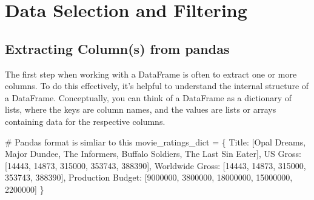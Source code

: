 \documentclass[
  letterpaper,
  DIV=11,
  numbers=noendperiod]{scrreprt}
\newenvironment{Shaded}{\begin{snugshade}}{\end{snugshade}}
\newcommand{\CommentTok}[1]{\textcolor[rgb]{0.37,0.37,0.37}{#1}}
\newcommand{\DecValTok}[1]{\textcolor[rgb]{0.68,0.00,0.00}{#1}}
\newcommand{\NormalTok}[1]{\textcolor[rgb]{0.00,0.23,0.31}{#1}}
\newcommand{\OperatorTok}[1]{\textcolor[rgb]{0.37,0.37,0.37}{#1}}
\newcommand{\StringTok}[1]{\textcolor[rgb]{0.13,0.47,0.30}{#1}}
\begin{document}
\hypertarget{data-selection-and-filtering}{%
\section{Data Selection and
Filtering}\label{data-selection-and-filtering}}

\hypertarget{extracting-columns-from-pandas}{%
\subsection{Extracting Column(s) from
pandas}\label{extracting-columns-from-pandas}}

The first step when working with a DataFrame is often to extract one or
more columns. To do this effectively, it's helpful to understand the
internal structure of a DataFrame. Conceptually, you can think of a
DataFrame as a dictionary of lists, where the keys are column names, and
the values are lists or arrays containing data for the respective
columns.

\begin{Shaded}
\begin{Highlighting}[]
\CommentTok{\# Pandas format is simliar to this}
\NormalTok{movie\_ratings\_dict }\OperatorTok{=}\NormalTok{ \{}
    \StringTok{\textquotesingle{}Title\textquotesingle{}}\NormalTok{:  [}\StringTok{\textquotesingle{}Opal Dreams\textquotesingle{}}\NormalTok{, }\StringTok{\textquotesingle{}Major Dundee\textquotesingle{}}\NormalTok{, }\StringTok{\textquotesingle{}The Informers\textquotesingle{}}\NormalTok{, }\StringTok{\textquotesingle{}Buffalo Soldiers\textquotesingle{}}\NormalTok{, }\StringTok{\textquotesingle{}The Last Sin Eater\textquotesingle{}}\NormalTok{],}
    \StringTok{\textquotesingle{}US Gross\textquotesingle{}}\NormalTok{:  [}\DecValTok{14443}\NormalTok{, }\DecValTok{14873}\NormalTok{, }\DecValTok{315000}\NormalTok{, }\DecValTok{353743}\NormalTok{, }\DecValTok{388390}\NormalTok{],}
    \StringTok{\textquotesingle{}Worldwide Gross\textquotesingle{}}\NormalTok{: [}\DecValTok{14443}\NormalTok{, }\DecValTok{14873}\NormalTok{, }\DecValTok{315000}\NormalTok{, }\DecValTok{353743}\NormalTok{, }\DecValTok{388390}\NormalTok{],}
    \StringTok{\textquotesingle{}Production Budget\textquotesingle{}}\NormalTok{: [}\DecValTok{9000000}\NormalTok{, }\DecValTok{3800000}\NormalTok{, }\DecValTok{18000000}\NormalTok{, }\DecValTok{15000000}\NormalTok{, }\DecValTok{2200000}\NormalTok{]}
\NormalTok{\}}
\end{Highlighting}
\end{Shaded}
\end{document}
